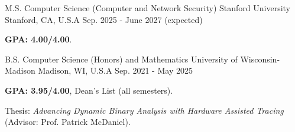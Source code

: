 

\begin{cventries}

  \cventry
    {M.S. Computer Science (Computer and Network Security)} %
    {Stanford University} %
    {Stanford, CA, U.S.A} %
    {Sep. 2025 - June 2027 (expected)} %
    {
      \begin{cvitems} %
        \item {\textbf{GPA: 4.00/4.00}.}
      \end{cvitems}
    }

  \cventry
    {B.S. Computer Science (Honors) and Mathematics} %
    {University of Wisconsin-Madison} %
    {Madison, WI, U.S.A} %
    {Sep. 2021 - May 2025} %
    {
      \begin{cvitems} %
        \item {\textbf{GPA: 3.95/4.00}, Dean's List (all semesters).}
        \item {Thesis: \textit{Advancing Dynamic Binary Analysis with Hardware Assisted Tracing} (Advisor: Prof. Patrick McDaniel).}
      \end{cvitems}
    }

\end{cventries}
